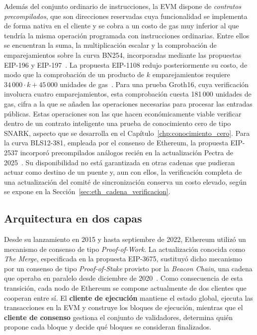 Además del conjunto ordinario de instrucciones, la EVM dispone de \textit{contratos
precompilados}, que son direcciones reservadas cuya funcionalidad se implementa de forma nativa
en el cliente y se cobra a un costo de gas muy inferior al que tendría la misma operación
programada con instrucciones ordinarias. Entre ellos se encuentran la suma, la multiplicación
escalar y la comprobación de emparejamientos sobre la curva BN254, incorporadas mediante las
propuestas EIP-196 y EIP-197~\cite{eip196, eip197}. La propuesta EIP-1108 redujo
posteriormente su costo, de modo que la comprobación de un producto de $k$ emparejamientos
requiere $34\,000 \cdot k + 45\,000$ unidades de gas~\cite{eip1108}. Para una prueba Groth16,
cuya verificación involucra cuatro emparejamientos, esta comprobación cuesta 181\,000 unidades de
gas, cifra a la que se añaden las operaciones necesarias para procesar las entradas públicas.
Estas operaciones son las que hacen económicamente viable verificar dentro de un contrato
inteligente una prueba de conocimiento cero de tipo SNARK, aspecto que se desarrolla en el
Capítulo~\ref{chp:conocimiento_cero}. Para la curva BLS12-381, empleada por el consenso de
Ethereum, la propuesta EIP-2537 incorporó precompilados análogos recién en la actualización
Pectra de 2025~\cite{eip2537}. Su disponibilidad no está garantizada en otras cadenas que
pudieran actuar como destino de un puente y, aun con ellos, la verificación completa de una
actualización del comité de sincronización conserva un costo elevado, según se expone en la
Sección~\ref{sec:eth_cadena_verificacion}.

\subsection{Arquitectura en dos capas}
\label{sec:eth_capas}

Desde su lanzamiento en 2015 y hasta septiembre de 2022, Ethereum utilizó un mecanismo de
consenso de tipo \textit{Proof-of-Work}. La actualización conocida como \textit{The Merge},
especificada en la propuesta EIP-3675, sustituyó dicho mecanismo por un consenso de tipo
\textit{Proof-of-Stake} provisto por la \textit{Beacon Chain}, una cadena que operaba en
paralelo desde diciembre de 2020~\cite{eip3675}. Como consecuencia de esta transición, cada nodo
de Ethereum se compone actualmente de dos clientes que cooperan entre sí. El \textbf{cliente de
ejecución} mantiene el estado global, ejecuta las transacciones en la EVM y construye los bloques
de ejecución, mientras que el \textbf{cliente de consenso} gestiona el conjunto de validadores,
determina quién propone cada bloque y decide qué bloques se consideran finalizados.

